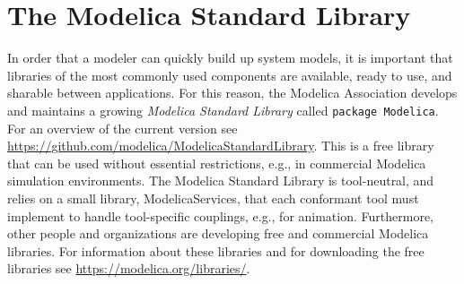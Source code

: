\chapter{The Modelica Standard Library}\label{the-modelica-standard-library}

In order that a modeler can quickly build up system models, it is
important that libraries of the most commonly used components are
available, ready to use, and sharable between applications. For this
reason, the Modelica Association develops and maintains a growing
\emph{Modelica Standard Library} called \lstinline!package Modelica!. For an
overview of the current version see
\url{https://github.com/modelica/ModelicaStandardLibrary}.
This is a free library that can be used without essential restrictions, e.g., in
commercial Modelica simulation environments. The Modelica Standard
Library is tool-neutral, and relies on a small library,
ModelicaServices, that each conformant tool must implement to handle
tool-specific couplings, e.g., for animation. Furthermore, other people
and organizations are developing free and commercial Modelica libraries.
For information about these libraries and for downloading the free
libraries see \url{https://modelica.org/libraries/}.
